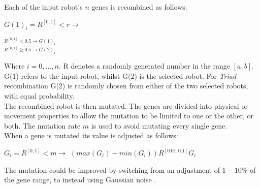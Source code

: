 \documentclass{article}
\begin{document}
Each of the input robot's $n$ genes is recombined as follows:
\begin{center}
\begin{Large}
$G(1)_{i} = R^{[0, 1]} < r \longrightarrow$ 
\begin{LARGE}
$^{R^{[0, 1]} < 0.5\longrightarrow G(1)_{i}} 
_{R^{[0, 1]} \geq 0.5 \longrightarrow G(2)_{i}}$
\end{LARGE}
\end{Large}
\end{center}

Where $i = 0, ..., n$. R denotes a randomly generated number in the range $[a, b]$. G(1) refers to the input robot, whilst G(2) is the selected robot. For \textit{Triad} recombination G(2) is randomly chosen from either of the two selected robots, with equal probability.\\

The recombined robot is then mutated. The genes are divided into physical or movement properties to allow the mutation to be limited to one or the other, or both.
The mutation rate $m$ is used to avoid mutating every single gene.\\
When a gene is mutated its value is adjusted as follows:
\begin{center}
\begin{Large}
$G_{i} = R^{[0, 1]} < m \longrightarrow $
$(max(G_{i}) - min(G_{i})) R^{[0.01, 0.1]}  G_{i}$\\[1\baselineskip]
\end{Large}
\end{center}
The mutation could be improved by switching from an adjustment of $1-10\%$ of the gene range, to instead using Gaussian noise .\\
\end{document}

